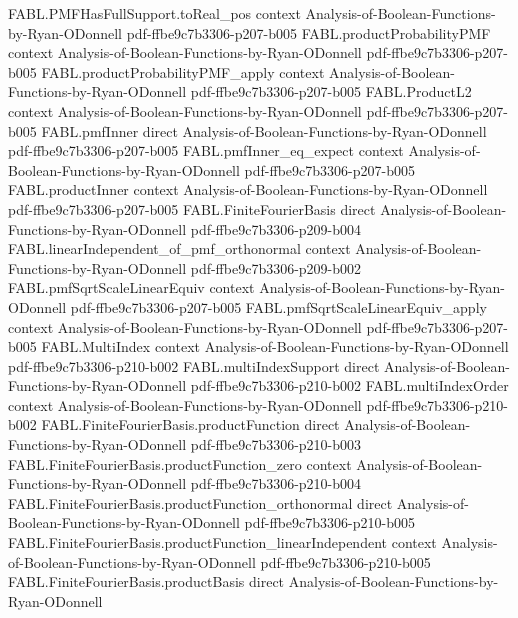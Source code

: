 \begin{theorem}
  {FABL.PMFHasFullSupport.toReal_pos}
  {context}
  {Analysis-of-Boolean-Functions-by-Ryan-ODonnell}
  {pdf-ffbe9c7b3306-p207-b005}
\proofstep
  {FABL.productProbabilityPMF}
  {context}
  {Analysis-of-Boolean-Functions-by-Ryan-ODonnell}
  {pdf-ffbe9c7b3306-p207-b005}
\proofstep
  {FABL.productProbabilityPMF_apply}
  {context}
  {Analysis-of-Boolean-Functions-by-Ryan-ODonnell}
  {pdf-ffbe9c7b3306-p207-b005}
\proofstep
  {FABL.ProductL2}
  {context}
  {Analysis-of-Boolean-Functions-by-Ryan-ODonnell}
  {pdf-ffbe9c7b3306-p207-b005}
\proofstep
  {FABL.pmfInner}
  {direct}
  {Analysis-of-Boolean-Functions-by-Ryan-ODonnell}
  {pdf-ffbe9c7b3306-p207-b005}
\proofstep
  {FABL.pmfInner_eq_expect}
  {context}
  {Analysis-of-Boolean-Functions-by-Ryan-ODonnell}
  {pdf-ffbe9c7b3306-p207-b005}
\proofstep
  {FABL.productInner}
  {context}
  {Analysis-of-Boolean-Functions-by-Ryan-ODonnell}
  {pdf-ffbe9c7b3306-p207-b005}
\proofstep
  {FABL.FiniteFourierBasis}
  {direct}
  {Analysis-of-Boolean-Functions-by-Ryan-ODonnell}
  {pdf-ffbe9c7b3306-p209-b004}
\proofstep
  {FABL.linearIndependent_of_pmf_orthonormal}
  {context}
  {Analysis-of-Boolean-Functions-by-Ryan-ODonnell}
  {pdf-ffbe9c7b3306-p209-b002}
\proofstep
  {FABL.pmfSqrtScaleLinearEquiv}
  {context}
  {Analysis-of-Boolean-Functions-by-Ryan-ODonnell}
  {pdf-ffbe9c7b3306-p207-b005}
\proofstep
  {FABL.pmfSqrtScaleLinearEquiv_apply}
  {context}
  {Analysis-of-Boolean-Functions-by-Ryan-ODonnell}
  {pdf-ffbe9c7b3306-p207-b005}
\proofstep
  {FABL.MultiIndex}
  {context}
  {Analysis-of-Boolean-Functions-by-Ryan-ODonnell}
  {pdf-ffbe9c7b3306-p210-b002}
\proofstep
  {FABL.multiIndexSupport}
  {direct}
  {Analysis-of-Boolean-Functions-by-Ryan-ODonnell}
  {pdf-ffbe9c7b3306-p210-b002}
\proofstep
  {FABL.multiIndexOrder}
  {context}
  {Analysis-of-Boolean-Functions-by-Ryan-ODonnell}
  {pdf-ffbe9c7b3306-p210-b002}
\proofstep
  {FABL.FiniteFourierBasis.productFunction}
  {direct}
  {Analysis-of-Boolean-Functions-by-Ryan-ODonnell}
  {pdf-ffbe9c7b3306-p210-b003}
\proofstep
  {FABL.FiniteFourierBasis.productFunction_zero}
  {context}
  {Analysis-of-Boolean-Functions-by-Ryan-ODonnell}
  {pdf-ffbe9c7b3306-p210-b004}
\proofstep
  {FABL.FiniteFourierBasis.productFunction_orthonormal}
  {direct}
  {Analysis-of-Boolean-Functions-by-Ryan-ODonnell}
  {pdf-ffbe9c7b3306-p210-b005}
\proofstep
  {FABL.FiniteFourierBasis.productFunction_linearIndependent}
  {context}
  {Analysis-of-Boolean-Functions-by-Ryan-ODonnell}
  {pdf-ffbe9c7b3306-p210-b005}
\proofstep
  {FABL.FiniteFourierBasis.productBasis}
  {direct}
  {Analysis-of-Boolean-Functions-by-Ryan-ODonnell}

\end{theorem}
